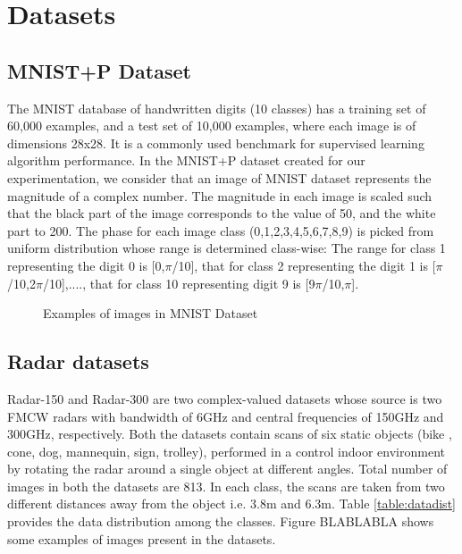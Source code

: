  
 \section{Datasets}\label{datasets}
 
 
 \subsection{MNIST+P Dataset}\label{data-mnistp}
 The MNIST database of handwritten digits (10 classes) has a training set of 60,000 examples, and a test set of 10,000 examples, where each image is of dimensions 28x28. It is a commonly used benchmark for supervised learning algorithm performance. In the MNIST+P dataset created for our experimentation, we consider that an image of MNIST dataset represents the magnitude of a complex number. The magnitude in each image is scaled such that the black part of the image corresponds to the value of 50, and the white part to 200. The phase for each image class (0,1,2,3,4,5,6,7,8,9) is picked from uniform distribution whose range is determined class-wise: The range for class 1 representing the digit 0 is [0,$\pi$/10], that for class 2 representing the digit 1 is [$\pi$/10,2$\pi$/10],...., that for class 10 representing digit 9 is [9$\pi$/10,$\pi$]. 
 
 \begin{figure}[htb]
 	\centering
 	\epsfxsize=7cm
 	{}\caption{Examples of images in MNIST Dataset \cite{mnistimage}}
 	\label{fig:blocks}
 \end{figure}
 
 \subsection{Radar datasets}\label{data-radar}
 
 Radar-150 and Radar-300 are two complex-valued datasets whose source is two FMCW radars with bandwidth of 6GHz and central frequencies of 150GHz and 300GHz, respectively.
 Both the datasets contain scans of six static objects (bike , cone, dog, mannequin, sign, trolley), performed in a control indoor environment by rotating the radar around a single object at different angles. Total number of images in both the datasets are 813. In each class, the scans are taken from two different distances away from the object i.e. 3.8m and 6.3m. Table \ref{table:datadist} provides the data distribution among the classes. Figure BLABLABLA shows some examples of images present in the datasets.
 
